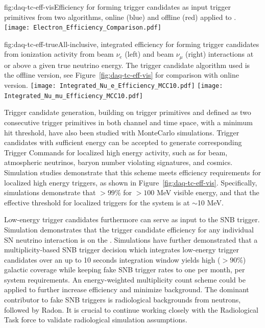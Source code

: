 \begin{dunefigure}{fig:daq-tc-eff-vis}{Efficiency for forming trigger
    candidates as input trigger primitives from two algorithms, online
    (blue) and offline (red) applied to . }
  \texttt{[image: Electron\_Efficiency\_Comparison.pdf]}
\end{dunefigure}

\begin{dunefigure}{fig:daq-tc-eff-true}{All-inclusive, integrated
    efficiency for forming trigger candidates from ionization activity
    from beam $\nu_e$ (left) and beam $\nu_\mu$ (right) interactions at
    or above a given true neutrino energy. 
    The trigger candidate algorithm used is the offline version, see
    Figure~\ref{fig:daq-tc-eff-vis} for comparison with online version.  }
  \texttt{[image: Integrated\_Nu\_e\_Efficiency\_MCC10.pdf]}%
  \texttt{[image: Integrated\_Nu\_mu\_Efficiency\_MCC10.pdf]}
\end{dunefigure}


Trigger candidate generation, building on trigger primitives and defined
as two consecutive trigger primitives in both channel and time space,
with a minimum hit threshold, have also been studied with MonteCarlo
simulations.
Trigger candidates with sufficient energy can be accepted to generate
corresponding Trigger Commands for localized high energy activity, such
as for beam, atmospheric neutrinos, baryon number violating signatures,
and cosmics.
Simulation studies demonstrate that this scheme meets efficiency
requirements for localized high energy triggers, as shown in
Figure~\ref{fig:daq-tc-eff-vis}.
Specifically, simulations demonstrate that $>99$\%  for $>100$ MeV visible
energy, and that the effective threshold for localized triggers for the
system is at $\sim$10 MeV. 

Low-energy trigger candidates furthermore can serve as input to the SNB
trigger.
Simulation demonstrates that the trigger candidate efficiency for any
individual SN neutrino interaction is on the .
Simulations have further demonstrated that a multiplicity-based SNB
trigger decision which integrates low-energy trigger candidates over an
up to 10 seconds integration window yields high ($>90$\%) galactic
coverage while keeping fake SNB trigger rates to one per month, per
system requirements.
An energy-weighted multiplicity count scheme could be applied to further
increase efficiency and minimize background.
The dominant contributor to fake SNB triggers is radiological
backgrounds from neutrons, followed by Radon. It is crucial to continue
working closely with the Radiological Task force to validate
radiological simulation assumptions.

